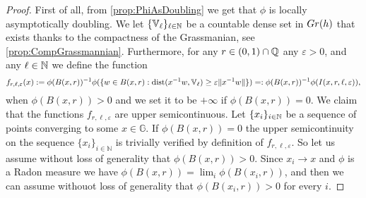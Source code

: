 \documentclass[10pt, a4paper,
oneside, headinclude,footinclude]{scrartcl}
\begin{document}
\begin{proof}
First of all, from \cref{prop:PhiAsDoubling} we get that $\phi$ is locally asymptotically doubling.  We let $\{\mathbb{V}_\ell\}_{\ell\in \mathbb{N}}$ be a countable dense set in $Gr(h)$ that exists thanks to the compactness of the Grassmanian, see \cref{prop:CompGrassmannian}. Furthermore, for any $r\in (0,1)\cap \mathbb{Q}$ any $\varepsilon>0$, and any $\ell\in\mathbb{N}$ we define the function
$$
f_{r,\ell,\varepsilon}(x):=\phi(B(x,r))^{-1}\phi(\{w\in B(x,r):\operatorname*{dist}(x^{-1}w,\mathbb{V}_\ell)\geq\varepsilon\lVert x^{-1}w\rVert\})=:\phi(B(x,r))^{-1}\phi(I(x,r,\ell,\varepsilon)),
$$
when $\phi(B(x,r))>0$ and we set it to be $+\infty$ if $\phi(B(x,r))=0$.
We claim that the functions $f_{r,\ell,\varepsilon}$ are upper semicontinuous. Let $\{x_i\}_{i\in\mathbb{N}}$ be a sequence of points converging to some $x\in\mathbb{G}$. If $\phi(B(x,r))=0$ the upper semicontinuity on the sequence $\{x_i\}_{i\in\mathbb N}$ is trivially verified by definition of $f_{r,\ell,\varepsilon}$. So let us assume without loss of generality that $\phi(B(x,r))>0$. Since $x_i\to x$ and $\phi$ is a Radon measure we have $\phi(B(x,r))= \lim_i \phi(B(x_i,r))$, and then we can assume withouot loss of generality that $\phi(B(x_i,r))>0$ for every $i$.


\end{proof}
\end{document}
